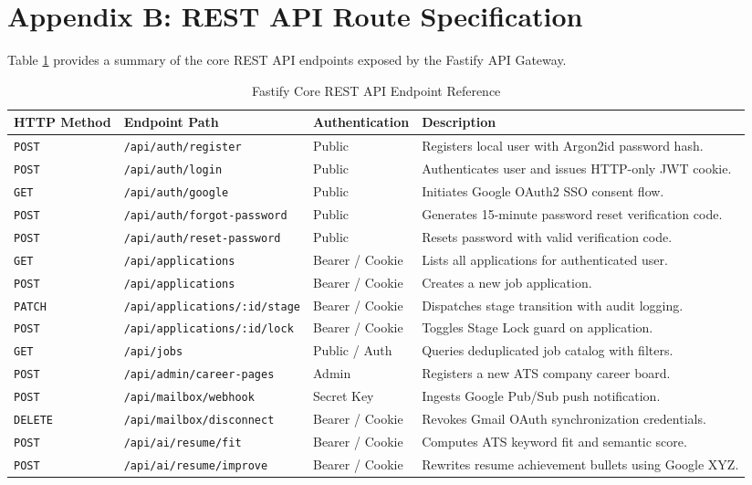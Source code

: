 \newpage
\section*{Appendix B: REST API Route Specification}

Table \ref{tab:api_routes} provides a summary of the core REST API endpoints exposed by the Fastify API Gateway.

\begin{table}[htbp]
\centering
\small
\caption{Fastify Core REST API Endpoint Reference}
\label{tab:api_routes}
\begin{tabularx}{\textwidth}{l l p{4.2cm} X}
\toprule
\textbf{HTTP Method} & \textbf{Endpoint Path} & \textbf{Authentication} & \textbf{Description} \\
\midrule
\texttt{POST} & \texttt{/api/auth/register} & Public & Registers local user with Argon2id password hash. \\
\texttt{POST} & \texttt{/api/auth/login} & Public & Authenticates user and issues HTTP-only JWT cookie. \\
\texttt{GET} & \texttt{/api/auth/google} & Public & Initiates Google OAuth2 SSO consent flow. \\
\texttt{POST} & \texttt{/api/auth/forgot-password} & Public & Generates 15-minute password reset verification code. \\
\texttt{POST} & \texttt{/api/auth/reset-password} & Public & Resets password with valid verification code. \\
\texttt{GET} & \texttt{/api/applications} & Bearer / Cookie & Lists all applications for authenticated user. \\
\texttt{POST} & \texttt{/api/applications} & Bearer / Cookie & Creates a new job application. \\
\texttt{PATCH} & \texttt{/api/applications/:id/stage} & Bearer / Cookie & Dispatches stage transition with audit logging. \\
\texttt{POST} & \texttt{/api/applications/:id/lock} & Bearer / Cookie & Toggles Stage Lock guard on application. \\
\texttt{GET} & \texttt{/api/jobs} & Public / Auth & Queries deduplicated job catalog with filters. \\
\texttt{POST} & \texttt{/api/admin/career-pages} & Admin & Registers a new ATS company career board. \\
\texttt{POST} & \texttt{/api/mailbox/webhook} & Secret Key & Ingests Google Pub/Sub push notification. \\
\texttt{DELETE} & \texttt{/api/mailbox/disconnect} & Bearer / Cookie & Revokes Gmail OAuth synchronization credentials. \\
\texttt{POST} & \texttt{/api/ai/resume/fit} & Bearer / Cookie & Computes ATS keyword fit and semantic score. \\
\texttt{POST} & \texttt{/api/ai/resume/improve} & Bearer / Cookie & Rewrites resume achievement bullets using Google XYZ. \\
\bottomrule
\end{tabularx}
\end{table}

